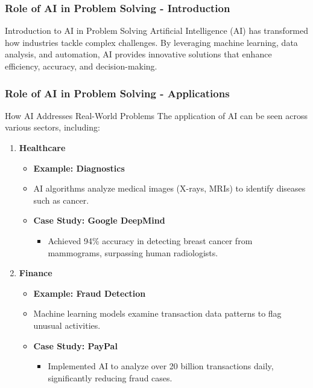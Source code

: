 \documentclass{beamer}
\begin{document}
\begin{frame}[fragile]
    \frametitle{Role of AI in Problem Solving - Introduction}
    \begin{block}{Introduction to AI in Problem Solving}
        Artificial Intelligence (AI) has transformed how industries tackle complex challenges. By leveraging machine learning, data analysis, and automation, AI provides innovative solutions that enhance efficiency, accuracy, and decision-making.
    \end{block}
\end{frame}

\begin{frame}[fragile]
    \frametitle{Role of AI in Problem Solving - Applications}
    \begin{block}{How AI Addresses Real-World Problems}
        The application of AI can be seen across various sectors, including:
    \end{block}
    
    \begin{enumerate}
        \item \textbf{Healthcare}
            \begin{itemize}
                \item \textbf{Example: Diagnostics}
                \item AI algorithms analyze medical images (X-rays, MRIs) to identify diseases such as cancer.
                \item \textbf{Case Study: Google DeepMind}
                \begin{itemize}
                    \item Achieved 94\% accuracy in detecting breast cancer from mammograms, surpassing human radiologists.
                \end{itemize}
            \end{itemize}
    
        \item \textbf{Finance}
            \begin{itemize}
                \item \textbf{Example: Fraud Detection}
                \item Machine learning models examine transaction data patterns to flag unusual activities.
                \item \textbf{Case Study: PayPal}
                \begin{itemize}
                    \item Implemented AI to analyze over 20 billion transactions daily, significantly reducing fraud cases.
                \end{itemize}
            \end{itemize}


\end{enumerate}
\end{frame}
\end{document}
